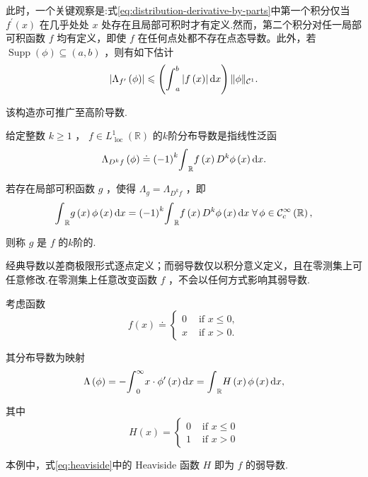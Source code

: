 此时，一个关键观察是:式\eqref{eq:distribution-derivative-by-parts}中第一个积分仅当 ${f}^{\prime }\left( x\right)$ 在几乎处处 $x$ 处存在且局部可积时才有定义.然而，第二个积分对任一局部可积函数 $f$ 均有定义，即使 $f$ 在任何点处都不存在点态导数。此外，若 $\operatorname{Supp}\left( \phi \right)  \subseteq  \left(  {a,b}\right)$ ，则有如下估计
\[
\left| {{\Lambda }_{{f}^{\prime }}\left( \phi \right) }\right|  \leqslant  \left( {{\int }_{a}^{b}\left| {f\left( x\right) }\right| {\mathop{}\!\mathrm{d} x}}\right) \| \phi {\| }_{{\mathcal{C}}^{1}}.
\]

该构造亦可推广至高阶导数.

\begin{definition}[分布导数与弱导数]\label{def:distribution-derivative}
给定整数 $k \geq  1$ ， $f \in  {L}_{\text{ loc }}^{1}\left( \mathbb{R}\right)$ 的$k$阶分布导数是指线性泛函
\[
{\Lambda }_{{D}^{k}f}\left( \phi \right)  \doteq  {\left( -1\right) }^{k}{\int }_{\mathbb{R}}f\left( x\right) {D}^{k}\phi \left( x\right) {\mathop{}\!\mathrm{d} x}.
\]

若存在局部可积函数 $g$ ，使得 ${\Lambda }_{g} = {\Lambda }_{{D}^{k}f}$ ，即
\[
{\int }_{\mathbb{R}}g\left( x\right) \phi \left( x\right) {\mathop{}\!\mathrm{d} x} = {\left( -1\right) }^{k}{\int }_{\mathbb{R}}f\left( x\right) {D}^{k}\phi \left( x\right) {\mathop{}\!\mathrm{d} x}\;\forall\,\phi  \in  {\mathcal{C}}_{c}^{\infty }\left( \mathbb{R}\right) ,
\]

则称 $g$ 是 $f$ 的$k$阶的.
\end{definition}

\begin{remark}\label{rem:weak-derivative-nullset}
经典导数以差商极限形式逐点定义；而弱导数仅以积分意义定义，且在零测集上可任意修改.在零测集上任意改变函数 $f$ ，不会以任何方式影响其弱导数.
\end{remark}

\begin{instance}\label{ins:weak-derivative-ramp}
考虑函数
\[
f\left( x\right)  \doteq  \left\{  \begin{array}{ll} 0 & \text{ if }x \leq  0, \\  x & \text{ if }x > 0. \end{array}\right.
\]

其分布导数为映射
\[
\Lambda \left( \phi \right)  =  - {\int }_{0}^{\infty }x \cdot  {\phi }^{\prime }\left( x\right) {\mathop{}\!\mathrm{d} x} = {\int }_{\mathbb{R}}H\left( x\right) \phi \left( x\right) {\mathop{}\!\mathrm{d} x},
\]

其中
\begin{equation}\tag{8.4}\label{eq:heaviside}
H\left( x\right)  = \left\{  \begin{array}{ll} 0 & \text{ if }x \leq  0 \\  1 & \text{ if }x > 0 \end{array}\right.
\end{equation}

本例中，式\eqref{eq:heaviside}中的 Heaviside 函数 $H$ 即为 $f$ 的弱导数.
\end{instance}

